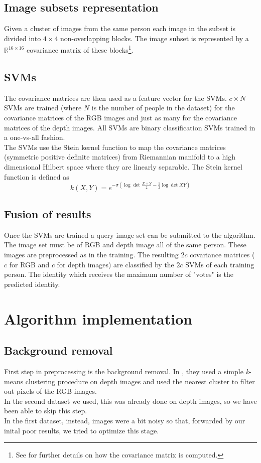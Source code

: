 \documentclass{article}
\begin{document}
\subsection{Image subsets representation}
Given a cluster of images from the same person each image in the subset is divided into $4 \times 4$ non-overlapping blocks. The image subset is represented by a $\mathbb{R}^{16 \times 16}$ covariance matrix of these blocks\footnote{See \citep{Hayat2016} for further details on how the covariance matrix is computed.}.

\subsection{SVMs}
The covariance matrices are then used as a feature vector for the SVMs. $c \times N$ SVMs are trained (where $N$ is the number of people in the dataset) for the covariance matrices of the RGB images and just as many for the covariance matrices of the depth images. All SVMs are binary classification SVMs trained in a one-vs-all fashion. \\
The SVMs use the Stein kernel function to map the covariance matrices (symmetric positive definite matrices) from Riemannian manifold to a high dimensional Hilbert space where they are linearly separable. The Stein kernel function is defined as $$k(X,Y) = e^{-\sigma (\log{\det{\frac{X+Y}{2}}} - \frac{1}{2}\log{\det{XY}})}$$

\subsection{Fusion of results}
Once the SVMs are trained a query image set can be submitted to the algorithm. The image set must be of RGB and depth image all of the same person. These images are preprocessed as in the training. The resulting $2c$ covariance matrices ($c$ for RGB and $c$ for depth images) are classified by the $2c$ SVMs of each training person. The identity which receives the maximum number of "votes" is the predicted identity.


\section{Algorithm implementation}

\subsection{Background removal}
\label{sec:background}
First step in preprocessing is the background removal. In \cite{Hayat2016},
they used a simple \textit{k}-means clustering procedure on depth images and
used the nearest cluster to filter out pixels of the RGB images.
\\
In the second dataset we used, this was already done on depth images, so we
have been able to skip this step.
\\
In the first dataset, instead, images were a bit noisy so that, forwarded by
our inital poor results, we tried to optimize this stage.
\end{document}
